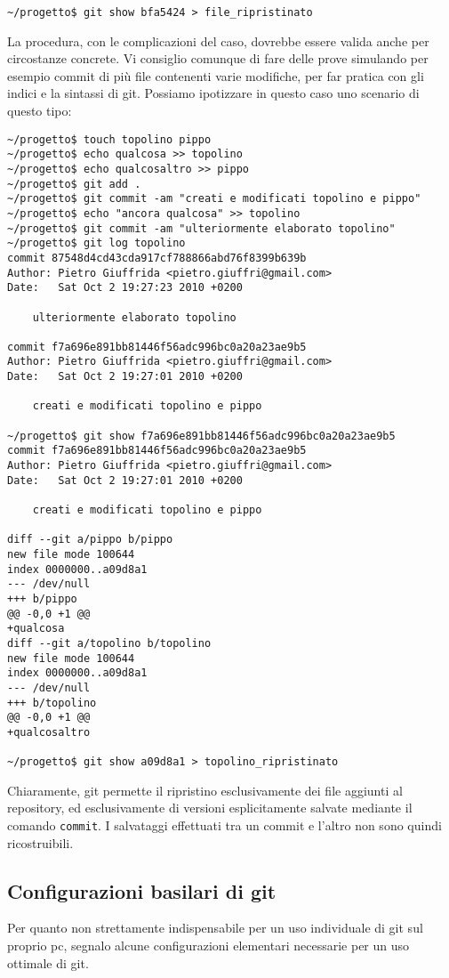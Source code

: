 \documentclass[a4paper,12pt,oneside]{article}
\begin{document}
\begin{lstlisting}
~/progetto$ git show bfa5424 > file_ripristinato
\end{lstlisting}

La procedura, con le complicazioni del caso, dovrebbe essere valida anche per
circostanze concrete. Vi consiglio comunque di fare delle prove simulando per
esempio commit di più file contenenti varie modifiche, per far pratica con gli
indici e la sintassi di git.
Possiamo ipotizzare in questo caso uno scenario di questo tipo:

\begin{lstlisting}
~/progetto$ touch topolino pippo
~/progetto$ echo qualcosa >> topolino
~/progetto$ echo qualcosaltro >> pippo
~/progetto$ git add .
~/progetto$ git commit -am "creati e modificati topolino e pippo"
~/progetto$ echo "ancora qualcosa" >> topolino
~/progetto$ git commit -am "ulteriormente elaborato topolino"
~/progetto$ git log topolino
commit 87548d4cd43cda917cf788866abd76f8399b639b
Author: Pietro Giuffrida <pietro.giuffri@gmail.com>
Date:   Sat Oct 2 19:27:23 2010 +0200

    ulteriormente elaborato topolino

commit f7a696e891bb81446f56adc996bc0a20a23ae9b5
Author: Pietro Giuffrida <pietro.giuffri@gmail.com>
Date:   Sat Oct 2 19:27:01 2010 +0200

    creati e modificati topolino e pippo

~/progetto$ git show f7a696e891bb81446f56adc996bc0a20a23ae9b5
commit f7a696e891bb81446f56adc996bc0a20a23ae9b5
Author: Pietro Giuffrida <pietro.giuffri@gmail.com>
Date:   Sat Oct 2 19:27:01 2010 +0200

    creati e modificati topolino e pippo

diff --git a/pippo b/pippo
new file mode 100644
index 0000000..a09d8a1
--- /dev/null
+++ b/pippo
@@ -0,0 +1 @@
+qualcosa
diff --git a/topolino b/topolino
new file mode 100644
index 0000000..a09d8a1
--- /dev/null
+++ b/topolino
@@ -0,0 +1 @@
+qualcosaltro

~/progetto$ git show a09d8a1 > topolino_ripristinato
\end{lstlisting}

Chiaramente, git permette il ripristino esclusivamente dei file aggiunti al
repository, ed esclusivamente di versioni esplicitamente salvate mediante il
comando \lstinline|commit|. I salvataggi effettuati tra un commit e l'altro non
sono quindi ricostruibili.

\subsection{Configurazioni basilari di git}
Per quanto non strettamente indispensabile per un uso individuale di git sul
proprio pc, segnalo alcune configurazioni elementari necessarie per un uso
ottimale di git.
\end{document}
